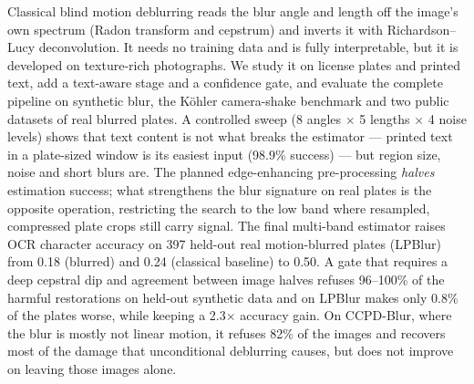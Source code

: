 Classical blind motion deblurring reads the blur angle and length off the image's own spectrum
(Radon transform and cepstrum) and inverts it with Richardson--Lucy deconvolution. It needs no
training data and is fully interpretable, but it is developed on texture-rich photographs. We
study it on license plates and printed text, add a text-aware stage and a confidence gate, and
evaluate the complete pipeline on synthetic blur, the K\"ohler camera-shake benchmark and two public
datasets of real blurred plates. A controlled sweep (8 angles $\times$ 5 lengths $\times$ 4 noise
levels) shows that text content is not what breaks the estimator --- printed text in a plate-sized
window is its easiest input (98.9\% success) --- but region size, noise and short blurs are. The
planned edge-enhancing pre-processing \emph{halves} estimation success; what strengthens the blur
signature on real plates is the opposite operation, restricting the search to the low band where
resampled, compressed plate crops still carry signal. The final multi-band estimator raises OCR
character accuracy on 397 held-out real motion-blurred plates (LPBlur) from 0.18 (blurred) and
0.24 (classical baseline) to 0.50. A gate that requires a deep cepstral dip and agreement between
image halves refuses 96--100\% of the harmful restorations on held-out synthetic data and on
LPBlur makes only 0.8\% of the plates worse, while keeping a 2.3$\times$ accuracy gain. On
CCPD-Blur, where the blur is mostly not linear motion, it refuses 82\% of the images and recovers
most of the damage that unconditional deblurring causes, but does not improve on leaving those
images alone.
